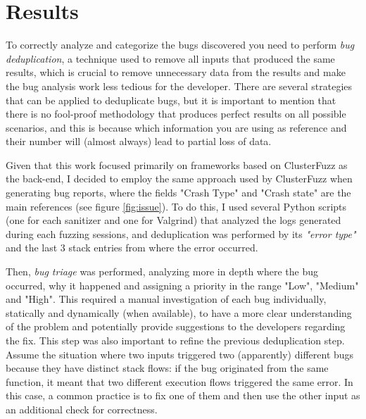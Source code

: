 \chapter{Results} \label{chap_4}


To correctly analyze and categorize the bugs discovered you need to perform \textit{bug deduplication}, a technique used to remove all inputs that produced the same results, which is crucial to remove unnecessary data from the results and make the bug analysis work less tedious for the developer. There are several strategies that can be applied to deduplicate bugs, but it is important to mention that there is no fool-proof methodology that produces perfect results on all possible scenarios, and this is because which information you are using as reference and their number will (almost always) lead to partial loss of data.


Given that this work focused primarily on frameworks based on ClusterFuzz as the back-end, I decided to employ the same approach used by ClusterFuzz when generating bug reports, where the fields "Crash Type" and "Crash state" are the main references (see figure \ref{fig:issue}). To do this, I used several Python scripts (one for each sanitizer and one for Valgrind) that analyzed the logs generated during each fuzzing sessions, and deduplication was performed by its \textit{"error type"} and the last 3 stack entries from where the error occurred.

Then, \textit{bug triage} was performed, analyzing more in depth where the bug occurred, why it happened and assigning a priority in the range "Low", "Medium" and "High". This required a manual investigation of each bug individually, statically and dynamically (when available), to have a more clear understanding of the problem and potentially provide suggestions to the developers regarding the fix.
This step was also important to refine the previous deduplication step.  Assume the situation where two inputs triggered two (apparently) different bugs because they have distinct stack flows: if the bug originated from the same function, it meant that two different execution flows triggered the same error. In this case, a common practice is to fix one of them and then use the other input as an additional check for correctness.

